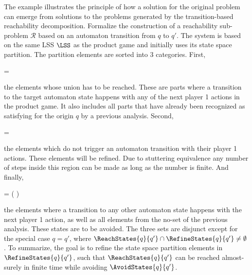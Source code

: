     The example illustrates the principle of how a solution for the original problem can emerge from solutions to the problems generated by the transition-based reachability decomposition.
    Formalize the construction of a reachability sub-problem $\mathcal{R}$ based on an automaton transition from $q$ to $q'$.
    The system is based on the same LSS $\LSS$ as the product game and initially uses its state space partition.
    The partition elements are sorted into 3 categories.
    First,

    \startformula
         =  \EndComma
    \stopformula

    the elements whose union has to be reached.
    These are parts where a transition to the target automaton state happens with any of the next player 1 actions in the product game.
    It also includes all parts that have already been recognized as satisfying for the origin $q$ by a previous analysis.
    Second,

    \startformula
         =  \EndComma
    \stopformula

    the elements which do not trigger an automaton transition with their player 1 actions.
    These elements will be refined.
    Due to stuttering equivalence any number of steps inside this region can be made as long as the number is finite.
    And finally,

    \startformula
         =  \setminus \left(  \cup {} \right) \EndComma
    \stopformula

    the elements where a transition to any other automaton state happens with the next player 1 action, as well as all elements from the no-set of the previous analysis.
    These states are to be avoided.
    The three sets are disjunct except for the special case $q = q'$, where $\ReachStates{q}{q'} \cap \RefineStates{q}{q'} \ne \emptyset$.
    To summarize, the goal is to refine the state space partition elements in $\RefineStates{q}{q'}$, such that $\ReachStates{q}{q'}$ can be reached almost-surely in finite time while avoiding $\AvoidStates{q}{q'}$.

\stopsubsection



